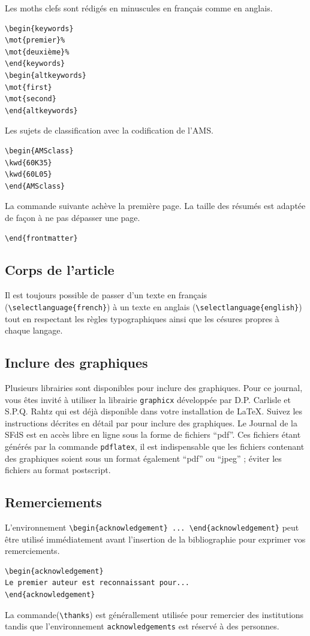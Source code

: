 \documentclass[soumission]{jsfds}
\begin{document}
Les moths clefs sont rédigés en minuscules en français comme en anglais.
\begin{verbatim}
\begin{keywords}
\mot{premier}%
\mot{deuxième}%
\end{keywords}
\begin{altkeywords}
\mot{first}
\mot{second}
\end{altkeywords}
\end{verbatim}
Les sujets de classification avec la codification de l'AMS.
\begin{verbatim}
\begin{AMSclass}
\kwd{60K35}
\kwd{60L05}
\end{AMSclass}
\end{verbatim}
La commande suivante achève la première page. La taille des résumés est adaptée de façon à ne pas dépasser une page.
\begin{verbatim}
\end{frontmatter}
\end{verbatim}

\subsection{Corps de l'article}
Il est toujours possible de passer d'un texte en français (\verb+\selectlanguage{french}+) à un texte en anglais (\verb+\selectlanguage{english}+) tout en respectant les règles typographiques ainsi que les césures propres à chaque langage. 


\subsection{Inclure des graphiques}
Plusieurs librairies sont disponibles pour inclure des graphiques. Pour ce journal, vous êtes invité à utiliser la librairie \texttt{graphicx} développée par D.P. Carlisle et S.P.Q. Rahtz qui est déjà disponible dans votre installation de \LaTeX.
Suivez les instructions décrites en détail par \cite{gooms94} pour inclure des graphiques. Le Journal de la SFdS est en accès libre en ligne sous la forme de fichiers ``pdf''. Ces fichiers étant générés par la commande \texttt{pdflatex}, il est indispensable que les fichiers contenant des graphiques soient sous un format également ``pdf'' ou ``jpeg'' ; éviter les fichiers au format postscript. 

\subsection{Remerciements}
L'environnement \verb+\begin{acknowledgement} ... \end{acknowledgement}+ peut être utilisé immédiatement avant l'insertion de la bibliographie pour exprimer vos remerciements.
\begin{verbatim}
\begin{acknowledgement}
Le premier auteur est reconnaissant pour...
\end{acknowledgement}
\end{verbatim}
La commande(\verb+\thanks+) est générallement utilisée pour remercier des institutions tandis que l'environnement \texttt{acknowledgements} est réservé à des personnes.
\end{document}
